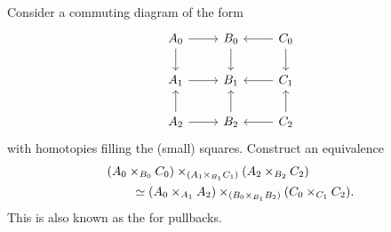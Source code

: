 \begin{exercises}
\begin{comment}
\item \label{ex:pb_fib}Consider a commuting square
\begin{equation*}
\begin{tikzcd}
C \arrow[d,swap,"p"] \arrow[r,"q"] & B \arrow[d,"g"] \\
A \arrow[r,swap,"f"] & X.
\end{tikzcd}
\end{equation*}
with $H:f\circ p\htpy g\circ q$, and let $h:C\to A\times_X B$ be the map given by $h(z)\defeq (p(c),q(c),H(c))$. 
Show that the square
\begin{equation*}
\begin{tikzcd}[column sep=6.5em]
\fib{\mathsf{gap}(p,q,H)}{(a,b,\alpha)} \arrow[d,swap,"\mathsf{const}_{\ttt}"] \arrow[r,"{\lam{(c,\beta)}(c,\ap{\pi_1}{\beta})}"] & \fib{p}{a} \arrow[d,"{\fibf{(f,g,H)}}"] \\
\unit \arrow[r,swap,"\mathsf{const}_{(b,\alpha^{-1})}"] & \fib{g}{f(a)}
\end{tikzcd}
\end{equation*}
\end{comment}
\item \label{ex:pb_3by3}Consider a commuting diagram of the form
\begin{equation*}
\begin{tikzcd}
A_0 \arrow[r] \arrow[d] & B_0 \arrow[d] & C_0 \arrow[l] \arrow[d] \\
A_1 \arrow[r] & B_1 & C_1 \arrow[l] \\
A_2 \arrow[u] \arrow[r] & B_2 \arrow[u] & C_2 \arrow[u] \arrow[l]
\end{tikzcd}
\end{equation*}
with homotopies filling the (small) squares. Construct an equivalence
\begin{align*}
& (A_0\times_{B_0} C_0) \times_{(A_1\times_{B_1} C_1)} (A_2\times_{B_2} C_2) \\
& \qquad \simeq (A_0\times_{A_1} A_2) \times_{(B_0\times_{B_1} B_2)} (C_0\times_{C_1} C_2).
\end{align*}
This is also known as the  for pullbacks.
\end{exercises}
